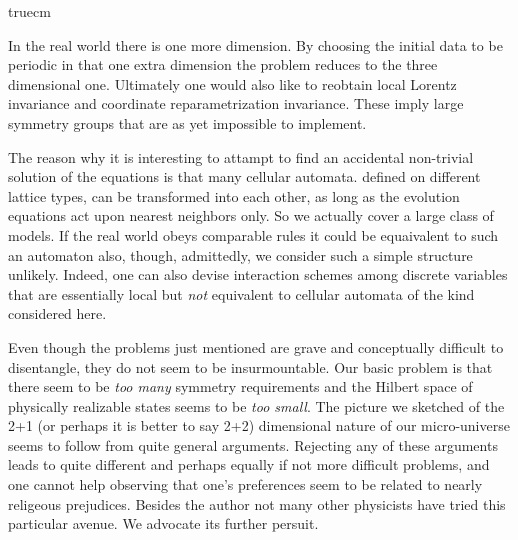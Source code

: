 \midinsert {} truecm 

  \endinsert

In the real world
there is one more dimension. By choosing the initial data to be
periodic in that one extra dimension the problem reduces to the three
dimensional one. Ultimately one would also like to reobtain local
Lorentz invariance and coordinate reparametrization invariance. These
imply large symmetry groups that are as yet impossible to implement.

The reason why it is interesting to attampt to find an accidental
non-trivial solution of the equations is that many cellular automata.
defined on different lattice types, can be transformed into each other,
as long as the evolution equations act upon nearest neighbors only. So
we actually cover a large class of models. If the real world obeys
comparable rules it could be equaivalent to such an automaton also,
though, admittedly, we consider such a simple structure unlikely.
Indeed, one can also devise interaction schemes among discrete
variables that are essentially local but {\it not} equivalent to
cellular automata of the kind considered here.

Even though the problems just mentioned are grave and conceptually
difficult to disentangle, they do not seem to be insurmountable. Our
basic problem is that there seem to be {\it too many} symmetry
requirements and the Hilbert space of physically realizable states
seems to be {\it too small}. The picture we sketched of the 2+1 (or
perhaps it is better to say 2+2) dimensional nature of our
micro-universe seems to follow from quite general arguments. Rejecting
any of these arguments leads to quite different and perhaps equally if
not more difficult problems, and one cannot help observing that one's
preferences seem to be related to nearly religeous prejudices. Besides
the author not many other physicists have tried this particular avenue.
We advocate its further persuit.
\bigskip
{}
\medskip

